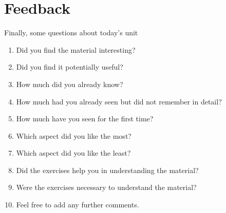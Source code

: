 \documentclass[twoside,a4paper]{article}
\begin{document}
\fi

\section{Feedback}


\begin{exercise}[5]
  Finally, some questions about today's unit
  \begin{enumerate}
  \item Did you find the material interesting?
  \item Did you find it potentially useful?
  \item How much did you already know?
  \item How much had you already seen but did not remember in detail?
  \item How much have you seen for the first time?
  \item Which aspect did you like the most?
  \item Which aspect did you like the least?
  \item Did the exercises help you in understanding the material?
  \item Were the exercises necessary to understand the material?
  \item Feel free to add any further comments.
  \end{enumerate}
\end{exercise}
\end{document}
